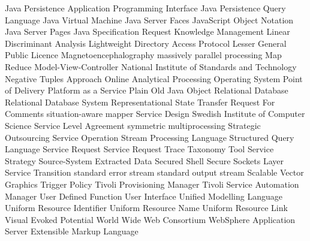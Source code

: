 \begin{acronym}[YTM]
  {Java Persistence Application Programming Interface}
 {Java Persistence Query Language}
  {Java Virtual Machine}
  {Java Server Faces}
 {JavaScript Object Notation}
  {Java Server Pages}
  {Java Specification Request}
   {Knowledge Management}
	{Linear Discriminant Analysis}
 {Lightweight Directory Access Protocol}
 {Lesser General Public Licence}
	{Magnetoencephalography}
	{massively parallel processing}
	{Map Reduce}
  {Model-View-Controller}
 {National Institute of Standards and Technology}
  {Negative Tuples Approach}
 {Online Analytical Processing} 
   {Operating System}
  {Point of Delivery}
 {Platform as a Service}
 {Plain Old Java Object}
  {Relational Database}
 {Relational Database System}
 {Representational State Transfer}
	{Request For Comments}
	{situation-aware mapper}
   {Service Design}
	{Swedish Institute of Computer Science}
  {Service Level Agreement}
	{symmetric multiprocessing}
	{Strategic Outsourcing}
  {Service Operation}
  {Stream Processing Language}
	{Structured Query Language}
   {Service Request}
 {Service Request Trace Taxonomy Tool}
   {Service Strategy}
 {Source-System Extracted Data}
  {Secured Shell}
  {Secure Sockets Layer}
   {Service Transition}
 {standard error stream}
 {standard output stream}
  {Scalable Vector Graphics}
   {Trigger Policy}
  {Tivoli Provisioning Manager}
 {Tivoli Service Automation Manager}
	{User Defined Function}
   {User Interface}
  {Unified Modelling Language}
  {Uniform Resource Identifier}
  {Uniform Resource Name}
  {Uniform Resource Link}
	{Visual Evoked Potential}
  {World Wide Web Consortium}
  {WebSphere Application Server}
  {Extensible Markup Language}
\end{acronym}